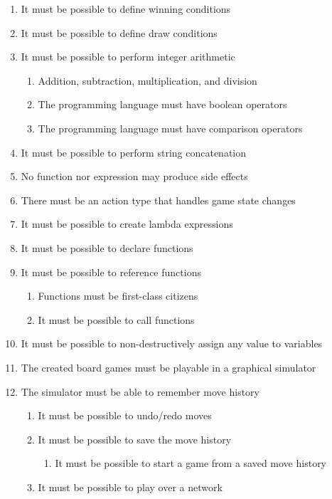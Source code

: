 \begin{enumerate}
  \item It must be possible to define winning conditions
  \item It must be possible to define draw conditions
  \item It must be possible to perform integer arithmetic
  \begin{enumerate}
    \item Addition, subtraction, multiplication, and division
    \item The programming language must have boolean operators
    \item The programming language must have comparison operators
  \end{enumerate}
  \item It must be possible to perform string concatenation
  \item No function nor expression may produce side effects
  \item There must be an action type that handles game state changes
  \item It must be possible to create lambda expressions
  \item It must be possible to declare functions
  \item It must be possible to reference functions
  \begin{enumerate}
    \item Functions must be first-class citizens
    \item It must be possible to call functions
  \end{enumerate}
  \item It must be possible to non-destructively assign any value to variables
  \item The created board games must be playable in a graphical simulator
  \item The simulator must be able to remember move history
  \begin{enumerate}
    \item It must be possible to undo/redo moves
    \item It must be possible to save the move history
    \begin{enumerate}
      \item It must be possible to start a game from a saved move history
    \end{enumerate}
  \item It must be possible to play over a network
  \end{enumerate}
\end{enumerate}

